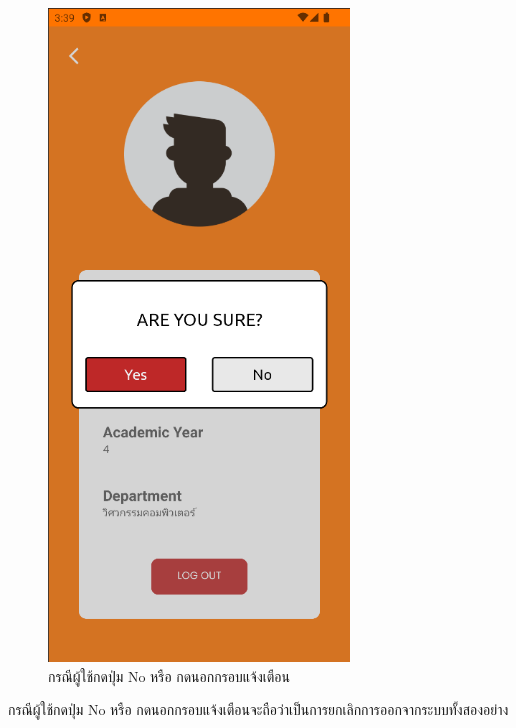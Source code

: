 \documentclass[14pt,oneside,openright,a4paper]{cpe-thai-project}
\begin{document}
\begin{figure}[!h]\centering
  \includegraphics[width=8cm]{./Pictures/CancleLogout.png}
  \caption{กรณีผู้ใช้กดปุ่ม No หรือ กดนอกกรอบแจ้งเตือน}\label{fig:CancleLogoutTest}
\end{figure}
  \hspace*{1cm} กรณีผู้ใช้กดปุ่ม No หรือ กดนอกกรอบแจ้งเตือนจะถือว่าเป็นการยกเลิกการออกจากระบบทั้งสองอย่าง

\newpage
\end{document}
